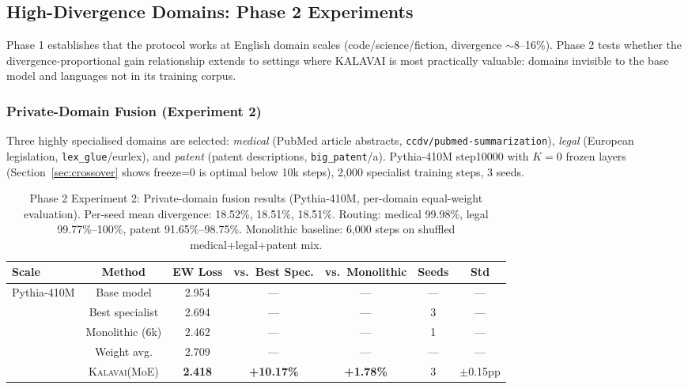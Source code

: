 \documentclass{article}
\newcommand{\kalavai}{\textsc{Kalavai}\xspace}
\begin{document}
\subsection{High-Divergence Domains: Phase 2 Experiments}
\label{sec:phase2}

Phase 1 establishes that the protocol works at English domain scales (code/science/fiction, divergence $\sim$8--16\%). Phase 2 tests whether the divergence-proportional gain relationship extends to settings where KALAVAI is most practically valuable: domains invisible to the base model and languages not in its training corpus.

\subsubsection{Private-Domain Fusion (Experiment 2)}
\label{sec:phase2_private}

Three highly specialised domains are selected: \emph{medical} (PubMed article abstracts, \texttt{ccdv/pubmed-summarization}), \emph{legal} (European legislation, \texttt{lex\_glue}/eurlex), and \emph{patent} (patent descriptions, \texttt{big\_patent}/a). Pythia-410M step10000 with $K=0$ frozen layers (Section~\ref{sec:crossover} shows freeze=0 is optimal below 10k steps), 2,000 specialist training steps, 3 seeds.

\begin{table}[h]
\centering
\caption{Phase 2 Experiment 2: Private-domain fusion results (Pythia-410M, per-domain equal-weight evaluation). Per-seed mean divergence: 18.52\%, 18.51\%, 18.51\%. Routing: medical 99.98\%, legal 99.77\%--100\%, patent 91.65\%--98.75\%. Monolithic baseline: 6,000 steps on shuffled medical+legal+patent mix.}
\label{tab:phase2_private}
\begin{tabular}{lcccccc}
\toprule
\textbf{Scale} & \textbf{Method} & \textbf{EW Loss} & \textbf{vs.\ Best Spec.} & \textbf{vs.\ Monolithic} & \textbf{Seeds} & \textbf{Std} \\
\midrule
\multirow{5}{*}{Pythia-410M}
 & Base model       & 2.954 & ---     & ---     & ---  & ---   \\
 & Best specialist  & 2.694 & ---     & ---     & 3    & ---   \\
 & Monolithic (6k)  & 2.462 & ---     & ---     & 1    & ---   \\
 & Weight avg.      & 2.709 & ---     & ---     & ---  & ---   \\
 & \kalavai (MoE)   & \textbf{2.418} & \textbf{+10.17\%} & \textbf{+1.78\%} & 3 & $\pm$0.15pp \\
\bottomrule
\end{tabular}
\end{table}
\end{document}

